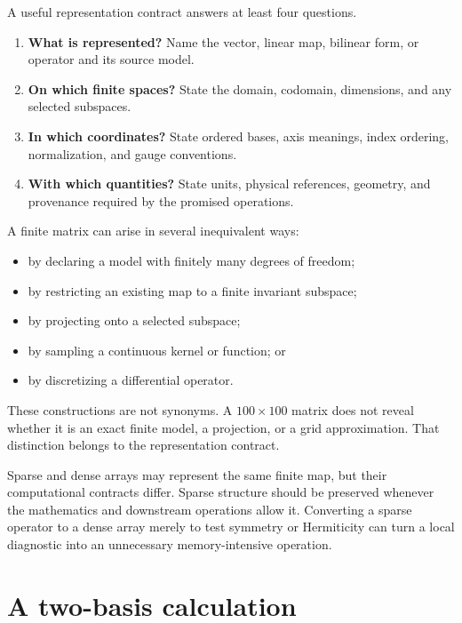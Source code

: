 A useful representation contract answers at least four questions.

\begin{enumerate}
  \item \textbf{What is represented?} Name the vector, linear map, bilinear
        form, or operator and its source model.
  \item \textbf{On which finite spaces?} State the domain, codomain,
        dimensions, and any selected subspaces.
  \item \textbf{In which coordinates?} State ordered bases, axis meanings,
        index ordering, normalization, and gauge conventions.
  \item \textbf{With which quantities?} State units, physical references,
        geometry, and provenance required by the promised operations.
\end{enumerate}

A finite matrix can arise in several inequivalent ways:

\begin{itemize}
  \item by declaring a model with finitely many degrees of freedom;
  \item by restricting an existing map to a finite invariant subspace;
  \item by projecting onto a selected subspace;
  \item by sampling a continuous kernel or function; or
  \item by discretizing a differential operator.
\end{itemize}

These constructions are not synonyms. A \(100\times100\) matrix does not reveal
whether it is an exact finite model, a projection, or a grid approximation.
That distinction belongs to the representation contract.

Sparse and dense arrays may represent the same finite map, but their
computational contracts differ. Sparse structure should be preserved whenever
the mathematics and downstream operations allow it. Converting a sparse
operator to a dense array merely to test symmetry or Hermiticity can turn a
local diagnostic into an unnecessary memory-intensive operation.

\section{A two-basis calculation}

